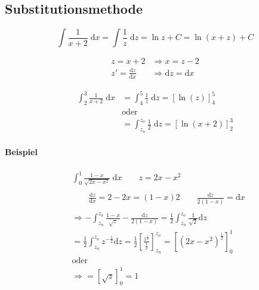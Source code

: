 \subsection{Substitutionsmethode}

\[
	\int \frac{1}{x+2} \;\mathrm{d}x = \int \frac{1}{z} \;\mathrm{d}z = \ln z + C = \ln (x+z) + C
\]

\begin{align*}
	z = x + 2                            & \Rightarrow x = z - 2                 \\
	z' = \frac{\mathrm{d}z}{\mathrm{d}x} & \Rightarrow \mathrm{d}z = \mathrm{d}x
\end{align*}

\begin{align*}
	\int_2^3 \frac{1}{x+2} \;\mathrm{d}x & = \int_4^5 \frac{1}{z} \;\mathrm{d}z = {[\ln(z)]}_4^5           \\
	                                     & \text{oder}                                                     \\
	                                     & = \int_{z_n}^{z_o} \frac{1}{2} \;\mathrm{d}z = {[\ln(x+2)]}_2^3
\end{align*}

\paragraph{Beispiel}

\begin{align*}
	 & \int_0^1 \frac{1-x}{\sqrt{2x-x^2}} \;\mathrm{d}x
	\qquad z = 2x - x^2                                                                 \\
	\\
	 & \qquad \frac{\mathrm{d}z}{\mathrm{d}x} = 2 - 2x = (1-x)2
	\qquad \frac{\mathrm{d}z}{2(1-x)} = \mathrm{d}x                                     \\
	\\
	 & \Rightarrow - \int_{z_n}^{z_o} \frac{1-x}{\sqrt{z}} - \frac{\mathrm{d}z}{2(1-x)}
	= \frac{1}{2} \int_{z_n}^{z_o} \frac{1}{\sqrt{2}} \mathrm{d}z                       \\
	 & = \frac{1}{2} \int_{z_n}^{z_o} z^{-\frac{1}{2}} \mathrm{d}z
	= \frac{1}{2} {\left[ \frac{z^{\frac{1}{2}}}{\frac{1}{2}} \right]}_{z_n}^{z_o}
	= {\left[ {\left( 2x-x^2 \right)}^\frac{1}{2} \right]}_0^1                          \\
	 & \text{oder}                                                                      \\
	 & \Rightarrow = {\left[ \sqrt{z} \right]}_0^1 = 1
\end{align*}
